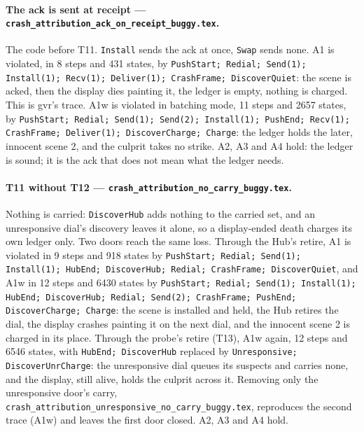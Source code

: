 \documentclass[a4paper,10pt,fleqn]{article}
\begin{document}
\paragraph{The ack is sent at receipt ---
\texttt{crash\_attribution\_ack\_on\_receipt\_buggy.tex}.}
The code before T11.  \texttt{Install} sends the ack at once, \texttt{Swap} sends none.
A1 is violated, in 8 steps and 431 states, by \texttt{PushStart; Redial;
Send(1); Install(1); Recv(1); Deliver(1); CrashFrame; DiscoverQuiet}: the scene is
acked, then the display dies painting it, the ledger is empty, nothing is
charged.  This is gvr's trace.  A1w is violated in batching mode, 11 steps and
2657 states, by \texttt{PushStart; Redial; Send(1); Send(2); Install(1); PushEnd;
Recv(1); CrashFrame; Deliver(1); DiscoverCharge; Charge}: the ledger holds the
later, innocent scene 2, and the culprit takes no strike.  A2, A3 and A4 hold:
the ledger is sound; it is the ack that does not mean what the ledger needs.

\paragraph{T11 without T12 ---
\texttt{crash\_attribution\_no\_carry\_buggy.tex}.}
Nothing is carried: \texttt{DiscoverHub} adds nothing to the carried set, and an
unresponsive dial's discovery leaves it alone, so a display-ended death charges
its own ledger only.  Two doors reach the same loss.  Through the Hub's retire,
A1 is violated in 9 steps and 918 states by \texttt{PushStart; Redial; Send(1);
Install(1); HubEnd; DiscoverHub; Redial; CrashFrame; DiscoverQuiet}, and A1w in 12
steps and 6430 states by \texttt{PushStart; Redial; Send(1); Install(1); HubEnd;
DiscoverHub; Redial; Send(2); CrashFrame; PushEnd; DiscoverCharge; Charge}: the
scene is installed and held, the Hub retires the dial, the display crashes
painting it on the next dial, and the innocent scene 2 is charged in its place.
Through the probe's retire (T13), A1w again, 12 steps and 6546 states, with
\texttt{HubEnd; DiscoverHub} replaced by \texttt{Unresponsive;
DiscoverUnrCharge}: the unresponsive dial queues its suspects and carries none,
and the display, still alive, holds the culprit across it.  Removing only the
unresponsive door's carry, \texttt{crash\_attribution\_unresponsive\_no\_carry\_buggy.tex},
reproduces the second trace (A1w) and leaves the first door closed.  A2, A3 and A4 hold.
\end{document}
